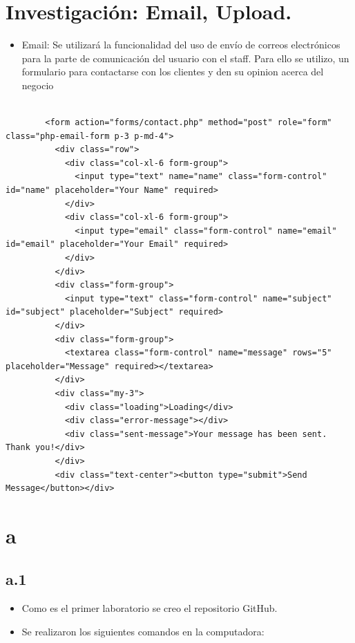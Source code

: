 \documentclass{article}
\begin{document}
	\section{Investigación: Email, Upload.}
        \begin{itemize}
            \item Email: Se utilizará la funcionalidad del uso de envío de correos electrónicos para la parte de comunicación del usuario con el staff. Para ello se utilizo, un formulario para contactarse con los clientes y den su opinion acerca del negocio
        \end{itemize}
        \begin{lstlisting}

        <form action="forms/contact.php" method="post" role="form" class="php-email-form p-3 p-md-4">
          <div class="row">
            <div class="col-xl-6 form-group">
              <input type="text" name="name" class="form-control" id="name" placeholder="Your Name" required>
            </div>
            <div class="col-xl-6 form-group">
              <input type="email" class="form-control" name="email" id="email" placeholder="Your Email" required>
            </div>
          </div>
          <div class="form-group">
            <input type="text" class="form-control" name="subject" id="subject" placeholder="Subject" required>
          </div>
          <div class="form-group">
            <textarea class="form-control" name="message" rows="5" placeholder="Message" required></textarea>
          </div>
          <div class="my-3">
            <div class="loading">Loading</div>
            <div class="error-message"></div>
            <div class="sent-message">Your message has been sent. Thank you!</div>
          </div>
          <div class="text-center"><button type="submit">Send Message</button></div>
        \end{lstlisting}
	\section{a}
	
	\subsection{a.1}
	\begin{itemize}	
		\item Como es el primer laboratorio se creo el repositorio GitHub.
		\item Se realizaron los siguientes comandos en la computadora:
	\end{itemize}	
		
\end{document}
